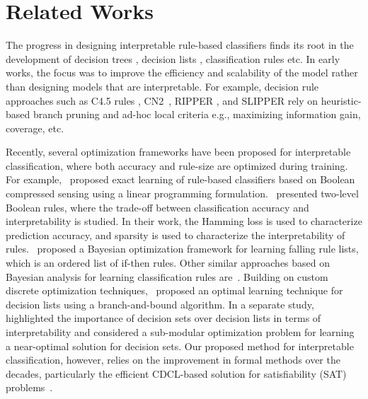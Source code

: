 \section{Related Works}
\label{interpretability_imli_sec:related}

The progress in designing interpretable rule-based classifiers finds its root in the development of decision trees \cite{bessiere2009minimising,quinlan1986induction,quinlan1987simplifying}, decision lists \cite{rivest1987learning}, classification rules \cite{cohen1995fast} etc.  In early works, the focus was to improve the efficiency and scalability of the model rather than designing models that are interpretable. For example,  decision rule approaches such as  C4.5 rules \cite{quinlan2014}, CN2~\cite{ClarkN1989}, RIPPER \cite{cohen1995fast}, and SLIPPER  \cite{CohenS1999} 
rely on heuristic-based branch pruning and ad-hoc local criteria e.g., maximizing information gain, coverage, etc.

Recently, several optimization frameworks have been proposed for interpretable classification, where both accuracy and rule-size are optimized during training. For example,~\cite{malioutov2013exact} proposed exact learning of rule-based classifiers based on Boolean compressed sensing using a linear programming formulation.~\cite{su2016learning} presented two-level Boolean rules, where the trade-off between classification accuracy and interpretability is studied. In their work, the Hamming loss is used to characterize prediction accuracy, and sparsity is used to characterize the interpretability of rules.~\cite{wang2015falling} proposed a Bayesian optimization framework for learning falling rule lists, which is an ordered list of if-then rules. Other similar approaches based on Bayesian analysis for learning classification rules are~\cite{letham2015interpretable,wang2017bayesian}. Building on custom discrete optimization techniques,~\cite{angelino2017learning} proposed an optimal learning technique for decision lists using a branch-and-bound algorithm. In a separate study,~\cite{lakkaraju2016interpretable} highlighted the importance of decision sets over decision lists in terms of interpretability and considered a sub-modular optimization problem for learning a near-optimal solution for decision sets. Our proposed method for interpretable classification, however, relies on the improvement in formal methods over the decades, particularly the efficient CDCL-based solution for satisfiability (SAT) problems~\cite{silva2003grasp}. 



